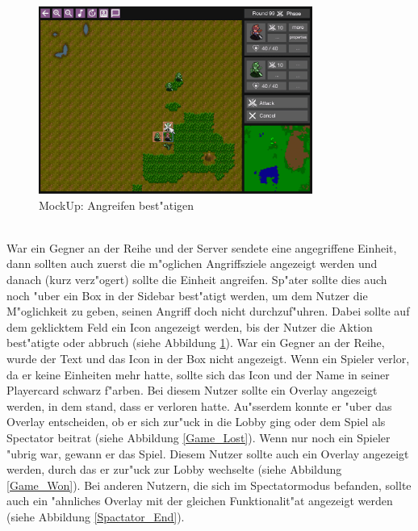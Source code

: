 \documentclass[12pt, titlepage]{scrartcl}
\newcounter{subsubsubsection}[subsubsection]
\begin{document}
			        \begin{figure}[H] 
    				    \centering
    				    \includegraphics[width=0.8\textwidth]{images/mockUps/Attack.png}
    				    \caption{MockUp: Angreifen best"atigen}
    				    \label{Attack}
			        \end{figure}
		        	\ \\ War ein Gegner an der Reihe und der Server sendete eine angegriffene Einheit, dann sollten auch zuerst die m"oglichen Angriffsziele angezeigt werden und danach (kurz verz"ogert) sollte die Einheit angreifen. Sp"ater sollte dies auch noch "uber ein Box in der Sidebar best"atigt werden, um dem Nutzer die M"oglichkeit zu geben, seinen Angriff doch nicht durchzuf"uhren. Dabei sollte auf dem geklicktem Feld ein Icon angezeigt werden, bis der Nutzer die Aktion best"atigte oder abbruch (siehe Abbildung \ref{Attack}). War ein Gegner an der Reihe, wurde der Text und das Icon in der Box nicht angezeigt.
			        Wenn ein Spieler verlor, da er keine Einheiten mehr hatte, sollte sich das Icon und der Name in seiner Playercard schwarz f"arben. Bei diesem Nutzer sollte ein Overlay angezeigt werden, in dem stand, dass er verloren hatte. Au"sserdem konnte er "uber das Overlay entscheiden, ob er sich zur"uck in die Lobby ging oder dem Spiel als Spectator beitrat (siehe Abbildung \ref{Game_Lost}). Wenn nur noch ein Spieler "ubrig war, gewann er das Spiel. Diesem Nutzer sollte auch ein Overlay angezeigt werden, durch das er zur"uck zur Lobby wechselte (siehe Abbildung \ref{Game_Won}). Bei anderen Nutzern, die sich im Spectatormodus befanden, sollte auch ein "ahnliches Overlay mit der gleichen Funktionalit"at angezeigt werden (siehe Abbildung \ref{Spactator_End}).
\end{document}
